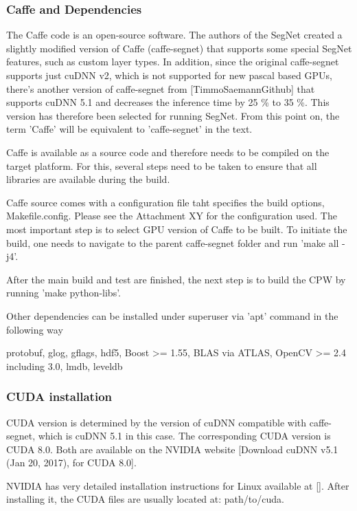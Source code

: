 \subsubsection{Caffe and Dependencies} 

The Caffe code is an open-source software. The authors of the SegNet created a slightly modified version of Caffe (caffe-segnet) that supports some special SegNet features, such as custom layer types. In addition, since the original caffe-segnet supports just cuDNN v2, which is not supported for new pascal based GPUs, there's another version of caffe-segnet from [TimmoSaemannGithub] that supports cuDNN 5.1 and decreases the inference time by 25 \% to 35 \%. This version has therefore been selected for running SegNet. From this point on, the term 'Caffe' will be equivalent to 'caffe-segnet' in the text.

Caffe is available as a source code and therefore needs to be compiled on the target platform. For this, several steps need to be taken to ensure that all libraries are available during the build.

Caffe source comes with a configuration file taht specifies the build options, Makefile.config. Please see the Attachment XY for the configuration used. The most important step is to select GPU version of Caffe to be built. To initiate the build, one needs to navigate to the parent caffe-segnet folder and run 'make all -j4'.

After the main build and test are finished, the next step is to build the CPW by running 'make python-libs'.

Other dependencies can be installed under superuser via 'apt' command in the following way



protobuf, glog, gflags, hdf5, Boost >= 1.55, BLAS via ATLAS, OpenCV >= 2.4 including 3.0, lmdb, leveldb

\subsubsection{CUDA installation}

CUDA version is determined by the version of cuDNN compatible with caffe-segnet, which is cuDNN 5.1 in this case. The corresponding CUDA version is CUDA 8.0. Both are available on the NVIDIA website [Download cuDNN v5.1 (Jan 20, 2017), for CUDA 8.0]. 

NVIDIA has very detailed installation instructions for Linux available at []. After installing it, the CUDA files are usually located at: path/to/cuda.

